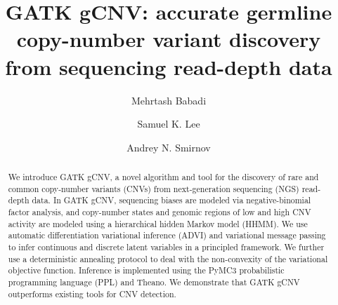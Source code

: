 \documentclass[sigplan]{acmart}\settopmatter{printfolios=true,printccs=false,printacmref=false}
\begin{document}
\title[GATK gCNV]{GATK gCNV: accurate germline copy-number variant discovery from sequencing read-depth data}

\author{Mehrtash Babadi}

\author{Samuel K. Lee}

\author{Andrey N. Smirnov}

\begin{abstract}
We introduce GATK gCNV, a novel algorithm and tool for the discovery of rare and common copy-number variants (CNVs) from next-generation sequencing (NGS) read-depth data. In GATK gCNV, sequencing biases are modeled via negative-binomial factor analysis, and copy-number states and genomic regions of low and high CNV activity are modeled using a hierarchical hidden Markov model (HHMM). We use automatic differentiation variational inference (ADVI) and variational message passing to infer continuous and discrete latent variables in a principled framework. We further use a deterministic annealing protocol to deal with the non-convexity of the variational objective function. Inference is implemented using the PyMC3 probabilistic programming language (PPL) and Theano. We demonstrate that GATK gCNV outperforms existing tools for CNV detection.
\end{abstract}

\maketitle
\end{document}

